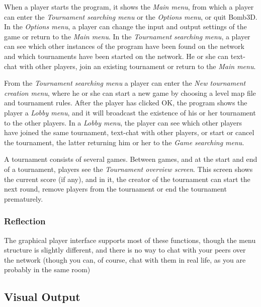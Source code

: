 When a player starts the program, it shows the \emph{Main menu}, from which a player can enter the \emph{Tournament searching menu} or the \emph{Options menu}, or quit Bomb3D. In the \emph{Options menu}, a player can change the input and output settings of the game or return to the \emph{Main menu}. In the \emph{Tournament searching menu}, a player can see which other instances of the program have been found on the network and which tournaments have been started on the network. He or she can text-chat with other players, join an existing tournament or return to the \emph{Main menu}.

From the \emph{Tournament searching menu} a player can enter the \emph{New tournament creation menu}, where he or she can start a new game by choosing a level map file and tournament rules. After the player has clicked OK, the program shows the player a \emph{Lobby menu}, and it will broadcast the existence of his or her tournament to the other players. In a \emph{Lobby menu}, the player can see which other players have joined the same tournament, text-chat with other players, or start or cancel the tournament, the latter returning him or her to the \emph{Game searching menu}.

A tournament consists of several games. Between games, and at the start and end of a tournament, players see the \emph{Tournament overview screen}. This screen shows the current score (if any), and in it, the creator of the tournament can start the next round, remove players from the tournament or end the tournament prematurely.

\subsubsection{Reflection}
The graphical player interface supports most of these functions, though the menu structure is slightly different, and there is no way to chat with your peers over the network (though you can, of course, chat with them in real life, as you are probably in the same room)
\subsection{Visual Output}

